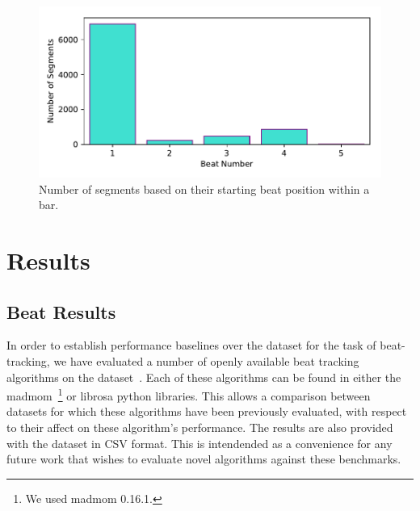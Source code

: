 \documentclass{article}
\begin{document}
\begin{figure}
    \centerline{\includegraphics[width=\columnwidth]{figs/Downbeat_Segment_Alignment.pdf}}
    \caption{Number of segments based on their starting beat position within a bar.}
    \label{fig:downbeat_segment}
\end{figure}

\section{Results}\label{sec:results}

\subsection{Beat Results}

In order to establish performance baselines over the dataset for the task of beat-tracking, we have evaluated a number of openly available beat
tracking algorithms on the dataset~\cite{Ellis2007, Krebs2015, Korzeniowski2014, Bock2011}. Each of these algorithms can be found in either the
madmom~\cite{Bock2016b}\footnote{We used madmom 0.16.1.} or librosa python libraries. This allows a comparison between datasets for which these algorithms have been previously evaluated,
with respect to their affect on these algorithm's performance. The results are also provided with the dataset in CSV format. This is intendended
as a convenience for any future work that wishes to evaluate novel algorithms against these benchmarks.
\end{document}
